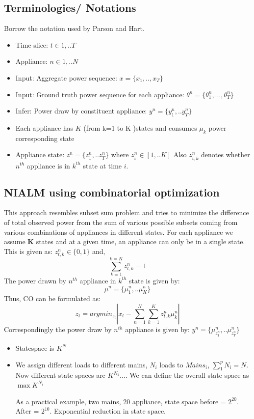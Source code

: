 \documentclass[conference]{IEEEtran}
\begin{document}
\subsection{Terminologies/ Notations}
Borrow the notation used by Parson and Hart.
\begin{itemize}
\item Time slice: $t\in {1,..T}$
\item Appliance: $n\in{1,..N}$
\item Input: Aggregate power sequence: $x=\{ x_1,..,x_T\}$
\item Input: Ground truth power sequence for each appliance: $\theta^n=\{\theta_1^n,...,\theta_T^n\}$
\item Infer: Power draw by constituent appliance: $y^n=\{y_1^n,..y_T^n\}$
\item Each appliance has $K$ (from k=1 to K )states and consumes $\mu_k$ power corresponding state
\item Appliance state: $z^n=\{z_1^n,..z_T^n\}$ where  $z_i^n \in [1,..K]$ Also $z_{i,k}^n$ denotes whether $n^{th}$ appliance is in $k^{th}$ state at time $i$.
\end{itemize}

\subsection{NIALM using combinatorial optimization}
This approach resembles subset sum problem and tries to minimize the difference of total observed power from the sum of various possible subsets coming from various combinations of appliances in different states. For each appliance we assume \textbf{K} states and at a given time, an appliance can only be in a single state. This is given as: 
$z_{t,k}^n\in\{0,1\} $ and, $$\sum\limits_{k=1}^{k=K} z_{t,k}^n=1$$The power drawn by $n^{th}$ appliance in $k^{th}$ state is given by:
$$\mu^n=\{\mu_1^n,..\mu_K^n\}$$ Thus, CO can be formulated as:
$$z_t=arg min_{z_t}|x_t-\sum\limits_{n=1}^{N}\sum\limits_{k=1}^{K}z_{t,k}^n\mu_k^n|$$
Correspondingly the power draw by $n^{th}$ appliance is given by: $y^n=\{\mu_{z_1^n}^n,..\mu_{z_T^n}^n \}$

\begin{itemize}
\item Statespace is $K^N$
\item We assign different loads to different mains, $N_i$ loads to $Mains_i$, $\sum\limits_{1}^{p}{N_i}=N$. Now different state spaces are
$K^{N_1}$.... We can define the overall state space as $\max{K^{N_i}}$

As a practical example, two mains, 20 appliance, state space before = $2^{20}$. After = $2^{10}$. Exponential reduction in state space.
\end{itemize}
\end{document}
